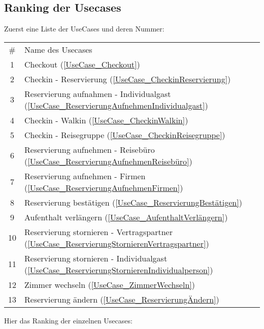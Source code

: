 \subsection{Ranking der Usecases}
Zuerst eine Liste der UseCases und deren Nummer:
\newline \newline
\begin{tabular} { |c | l |}
	\hline
	\# & Name des Usecases \\
	1 & Checkout (\ref{UseCase_Checkout})\\
	2 & Checkin - Reservierung (\ref{UseCase_CheckinReservierung})\\
	3 & Reservierung aufnahmen - Individualgast (\ref{UseCase_ReservierungAufnehmenIndividualgast})\\
	4 & Checkin - Walkin (\ref{UseCase_CheckinWalkin})\\
	5 & Checkin - Reisegruppe (\ref{UseCase_CheckinReisegruppe})\\
	6 & Reservierung aufnehmen - Reisebüro (\ref{UseCase_ReservierungAufnehmenReisebüro})\\
	7 & Reservierung aufnehmen - Firmen (\ref{UseCase_ReservierungAufnehmenFirmen})\\
	8 & Reservierung bestätigen (\ref{UseCase_ReservierungBestätigen})\\
	9 & Aufenthalt verlängern (\ref{UseCase_AufenthaltVerlängern})\\
	10 & Reservierung stornieren - Vertragspartner (\ref{UseCase_ReservierungStornierenVertragspartner})\\
	11 & Reservierung stornieren - Individualgast (\ref{UseCase_ReservierungStornierenIndividualperson})\\
	12 & Zimmer wechseln (\ref{UseCase_ZimmerWechseln})\\
	13 & Reservierung ändern (\ref{UseCase_ReservierungÄndern})\\
	\hline
\end{tabular}

\vspace{1cm}

Hier das Ranking der einzelnen Usecases:
\vspace{1cm}

